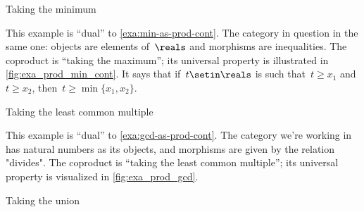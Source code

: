 \begin{figure}[h!
    ]
    \centering
    \caption{}
    \label{fig:coprod_disunion_diagram}
\end{figure}

\begin{marginfigure}
    \centering
    \caption{Taking the minimum}
    \label{fig:exa_coprod_max_cont}
\end{marginfigure}
\begin{example}
    \label{exa:min-as-prod-cont-to-rename}
    This example is ``dual'' to \cref{exa:min-as-prod-cont}.
    The category in question in the same one: objects are elements of~$\reals$ and morphisms are inequalities.
    The coproduct is ``taking the maximum''; its universal property is illustrated in \cref{fig:exa_prod_min_cont}.
    It says that if~$t \setin \reals$ is such that~$t \geq x_1$ and $t \geq x_2$, then~$t \geq \min \{ x_1, x_2 \}$.

\end{example}

\begin{marginfigure}
    \centering
    \caption{Taking the least common multiple}
    \label{fig:exa_coprod_lcm_cont}
\end{marginfigure}
\begin{example}
    \label{exa:lcm-as-coprod-cont}
    This example is ``dual'' to \cref{exa:gcd-as-prod-cont}.
    The category we're working in has natural numbers as its objects, and morphisms are given by the relation "divides".
    The coproduct is ``taking the least common multiple''; its universal property is visualized in \cref{fig:exa_prod_gcd}.
\end{example}

\begin{marginfigure}
    \centering
    \caption{Taking the union}
    \label{fig:exa_coprod_union_cont}
\end{marginfigure}


